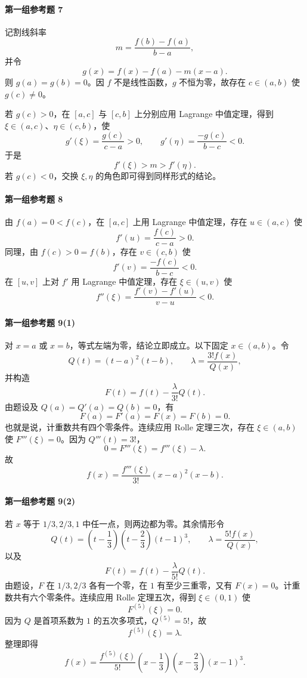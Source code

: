 \paragraph{第一组参考题 7}
\begin{xsolution}
记割线斜率
\[
  m=\frac{f(b)-f(a)}{b-a},
\]
并令
\[
  g(x)=f(x)-f(a)-m(x-a).
\]
则 $g(a)=g(b)=0$。因 $f$ 不是线性函数，$g$ 不恒为零，故存在 $c\in(a,b)$ 使 $g(c)\neq0$。

若 $g(c)>0$，在 $[a,c]$ 与 $[c,b]$ 上分别应用 Lagrange 中值定理，得到 $\xi\in(a,c)$、$\eta\in(c,b)$，使
\[
  g'(\xi)=\frac{g(c)}{c-a}>0,
  \qquad
  g'(\eta)=\frac{-g(c)}{b-c}<0.
\]
于是
\[
  f'(\xi)>m>f'(\eta).
\]
若 $g(c)<0$，交换 $\xi,\eta$ 的角色即可得到同样形式的结论。
\end{xsolution}

\paragraph{第一组参考题 8}
\begin{xsolution}
由 $f(a)=0<f(c)$，在 $[a,c]$ 上用 Lagrange 中值定理，存在 $u\in(a,c)$ 使
\[
  f'(u)=\frac{f(c)}{c-a}>0.
\]
同理，由 $f(c)>0=f(b)$，存在 $v\in(c,b)$ 使
\[
  f'(v)=\frac{-f(c)}{b-c}<0.
\]
在 $[u,v]$ 上对 $f'$ 用 Lagrange 中值定理，存在 $\xi\in(u,v)$ 使
\[
  f''(\xi)=\frac{f'(v)-f'(u)}{v-u}<0.
\]
\end{xsolution}

\paragraph{第一组参考题 9(1)}
\begin{xsolution}
对 $x=a$ 或 $x=b$，等式左端为零，结论立即成立。以下固定 $x\in(a,b)$。令
\[
  Q(t)=(t-a)^2(t-b),
  \qquad
  \lambda=\frac{3!f(x)}{Q(x)},
\]
并构造
\[
  F(t)=f(t)-\frac{\lambda}{3!}Q(t).
\]
由题设及 $Q(a)=Q'(a)=Q(b)=0$，有
\[
  F(a)=F'(a)=F(x)=F(b)=0.
\]
也就是说，计重数共有四个零条件。连续应用 Rolle 定理三次，存在 $\xi\in(a,b)$ 使 $F'''(\xi)=0$。因为 $Q'''(t)=3!$，
\[
  0=F'''(\xi)=f'''(\xi)-\lambda.
\]
故
\[
  f(x)=\frac{f'''(\xi)}{3!}(x-a)^2(x-b).
\]
\end{xsolution}

\paragraph{第一组参考题 9(2)}
\begin{xsolution}
若 $x$ 等于 $1/3,2/3,1$ 中任一点，则两边都为零。其余情形令
\[
  Q(t)=\left(t-\frac13\right)
       \left(t-\frac23\right)(t-1)^3,
  \qquad
  \lambda=\frac{5!f(x)}{Q(x)},
\]
以及
\[
  F(t)=f(t)-\frac{\lambda}{5!}Q(t).
\]
由题设，$F$ 在 $1/3,2/3$ 各有一个零，在 $1$ 有至少三重零，又有 $F(x)=0$。计重数共有六个零条件。连续应用 Rolle 定理五次，得到 $\xi\in(0,1)$ 使
\[
  F^{(5)}(\xi)=0.
\]
因为 $Q$ 是首项系数为 $1$ 的五次多项式，$Q^{(5)}=5!$，故
\[
  f^{(5)}(\xi)=\lambda.
\]
整理即得
\[
  f(x)=\frac{f^{(5)}(\xi)}{5!}
  \left(x-\frac13\right)
  \left(x-\frac23\right)(x-1)^3.
\]
\end{xsolution}

